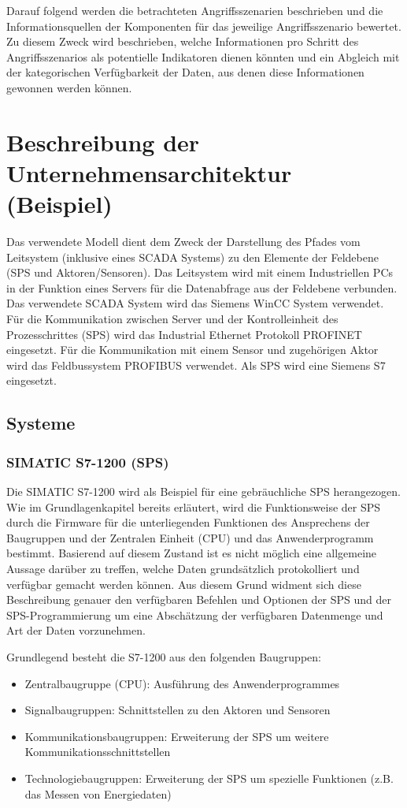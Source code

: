 Darauf folgend werden die betrachteten Angriffsszenarien beschrieben und die Informationsquellen der Komponenten für das jeweilige Angriffsszenario bewertet. Zu diesem Zweck wird beschrieben, welche Informationen pro Schritt des Angriffsszenarios als potentielle Indikatoren dienen könnten und ein Abgleich mit der kategorischen Verfügbarkeit der Daten, aus denen diese Informationen gewonnen werden können. 

\section{Beschreibung der Unternehmensarchitektur (Beispiel)}
Das verwendete Modell dient dem Zweck der Darstellung des Pfades vom Leitsystem (inklusive eines SCADA Systems) zu den Elemente der Feldebene (SPS und Aktoren/Sensoren). Das Leitsystem wird mit einem Industriellen PCs in der Funktion eines Servers für die Datenabfrage aus der Feldebene verbunden. Das verwendete SCADA System wird das Siemens WinCC System verwendet. Für die Kommunikation zwischen Server und der Kontrolleinheit des Prozesschrittes (SPS) wird das Industrial Ethernet Protokoll PROFINET eingesetzt. Für die Kommunikation mit einem Sensor und zugehörigen Aktor wird das Feldbussystem PROFIBUS verwendet. Als SPS wird eine Siemens S7 eingesetzt.

\subsection{Systeme}
\subsubsection{SIMATIC S7-1200 (SPS)}
Die SIMATIC S7-1200 wird als Beispiel für eine gebräuchliche SPS herangezogen. Wie im Grundlagenkapitel bereits erläutert, wird die Funktionsweise der SPS durch die Firmware für die unterliegenden Funktionen des Ansprechens der Baugruppen und der Zentralen Einheit (CPU) und das Anwenderprogramm bestimmt. Basierend auf diesem Zustand ist es nicht möglich eine allgemeine Aussage darüber zu treffen, welche Daten grundsätzlich protokolliert und verfügbar gemacht werden können. Aus diesem Grund widment sich diese Beschreibung genauer den verfügbaren Befehlen und Optionen der SPS und der SPS-Programmierung um eine Abschätzung der verfügbaren Datenmenge und Art der Daten vorzunehmen. 

Grundlegend besteht die S7-1200 aus den folgenden Baugruppen:
\begin{itemize}
\item Zentralbaugruppe (CPU): Ausführung des Anwenderprogrammes
\item Signalbaugruppen: Schnittstellen zu den Aktoren und Sensoren
\item Kommunikationsbaugruppen: Erweiterung der SPS um weitere Kommunikationsschnittstellen
\item Technologiebaugruppen: Erweiterung der SPS um spezielle Funktionen (z.B. das Messen von Energiedaten)
\end{itemize}

